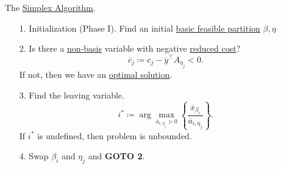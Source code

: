 \begin{prev}
	The \hyperref[algo:simplex-algorithm]{Simplex Algorithm}.
	\begin{enumerate}
		\item[1.] Initialization (Phase I). Find an initial \hyperref[def:basic-partition]{basic feasible partition} \(\beta, \eta\)
		\item[2.] Is there a \hyperref[def:non-basis]{non-basis} variable with negative \hyperref[def:reduced-cost]{reduced cost}?
			\[
				\overline{c}_j \coloneqq c_{j} - \overline{y}^{\top}A_{\eta_{j}}<0.
			\]
			If not, then we have an \hyperref[def:optimal-solution]{optimal solution}.
		\item[3.] Find the leaving variable.
			\[
				i^{\ast} \coloneqq \arg\max_{\overline{a}_{i, \eta_{j}}>0} {\left\{\frac{\overline{x}_{\beta_{i}}}{\overline{a}_{i, \eta_{j}}}\right\}}.
			\]
			If \(i^{\ast}\) is undefined, then problem is unbounded.
		\item[4.] Swap \(\beta_{i}\) and \(\eta_{j}\) and \textbf{GOTO 2}.
	\end{enumerate}
\end{prev}

